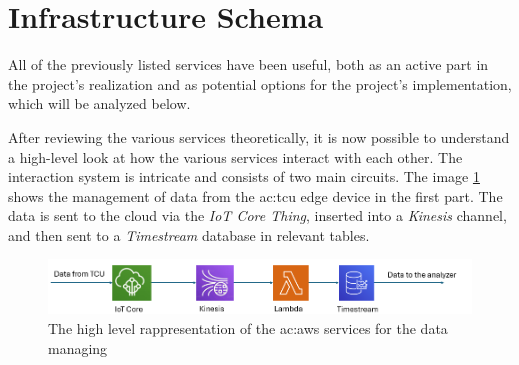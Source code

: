 \begin{itemize}
\end{itemize}

\section{Infrastructure Schema}
All of the previously listed services have been useful, both as an active part in the project's realization and as potential options for the project's implementation, which will be analyzed below. 

After reviewing the various services theoretically, it is now possible to understand a high-level look at how the various services interact with each other.
The interaction system is intricate and consists of two main circuits. The image \ref{fig:AWSDataServices} shows the management of data from the \gls{ac:tcu} edge device in the first part. The data is sent to the cloud via the \textit{IoT Core Thing}, inserted into a \textit{Kinesis} channel, and then sent to a \textit{Timestream} database in relevant tables.
\begin{figure}[h]  %
    \centering
    \includegraphics[width=1\textwidth]{images/AWS_data_services.png}  %
    \caption{The high level rappresentation of the \gls{ac:aws} services for the data managing}
    \label{fig:AWSDataServices}
\end{figure}

